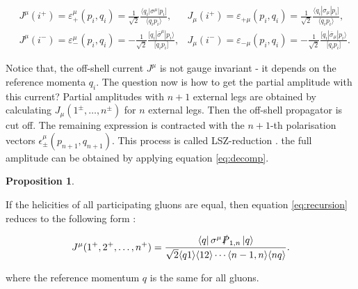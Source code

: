 \documentclass{article}
\theoremstyle{definition}
\newtheorem{prop}[theorem]{Proposition}
\numberwithin{equation}{section}
\begin{document}
\begin{subequations}
    \begin{align}
        &J^{\mu}(i^{+}) = \varepsilon_{+}^{\mu}(p_i,q_i) = \frac{1}{\sqrt{2}} \frac{ \langle q_i | \sigma^{\mu} | p_i \rbrack }{ \langle q_i p_i \rangle }, 
        &J_{\mu}(i^{+}) = \varepsilon_{+\mu}(p_i,q_i) = \frac{1}{\sqrt{2}} \frac{ \langle q_i | \sigma_{\mu} | p_i \rbrack }{ \langle q_i p_i \rangle }, \\
        &J^{\mu}(i^{-}) = \varepsilon_{-}^{\mu}(p_i,q_i) = - \frac{1}{\sqrt{2}} \frac{ \lbrack q_i | \overline{\sigma}^{\mu} | p_i \rangle }{ \lbrack q_i p_i \rbrack }, 
        &J_{\mu}(i^{-}) = \varepsilon_{-\mu}(p_i,q_i) = - \frac{1}{\sqrt{2}} \frac{ \lbrack q_i | \overline{\sigma}_{\mu} | p_i \rangle }{ \lbrack q_i p_i \rbrack }.
    \end{align}
\end{subequations}

Notice that, the off-shell current $J^{\mu}$ is not gauge invariant - it depends on the reference momenta $q_i$. The question now is how to get the partial amplitude with this current? Partial amplitudes with $n+1$ external legs are obtained by calculating $J_{\mu}(1^{\pm}, \dots, n^{\pm})$ for $n$ external legs. Then the off-shell propagator is cut off. The remaining expression is contracted with the $n+1$-th polarisation vectors $\epsilon_{\pm}^\mu(p_{n+1}, q_{n+1})$. This process is called LSZ-reduction \cite{lsz55}. the full amplitude can be obtained by applying equation \eqref{eq:decomp}.

\begin{prop}
\label{prop:Jppp}

    If the helicities of all participating gluons are equal, then equation \eqref{eq:recursion} reduces to the following form \cite{bg88recursive}:

    \begin{align}
        J^{\mu}(1^{+}, 2^{+}, \dots , n^{+}) = \frac{ \bra{q} \sigma^{\mu} \slashed{P}_{1,n} \ket{q} }{ \sqrt{2} \langle q1 \rangle \langle 12 \rangle \cdots \langle n-1,n \rangle \langle nq \rangle } \label{eq:prop1}.
    \end{align}

    where the reference momentum $q$ is the same for all gluons.

\end{prop}
\end{document}
